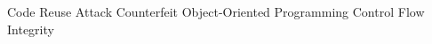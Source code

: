 \begin{acronym}
  \setlength{\itemsep}{-\parsep}
   	{Code Reuse Attack}
   {Counterfeit Object-Oriented Programming}
   {Control Flow Integrity}
 
\end{acronym}
